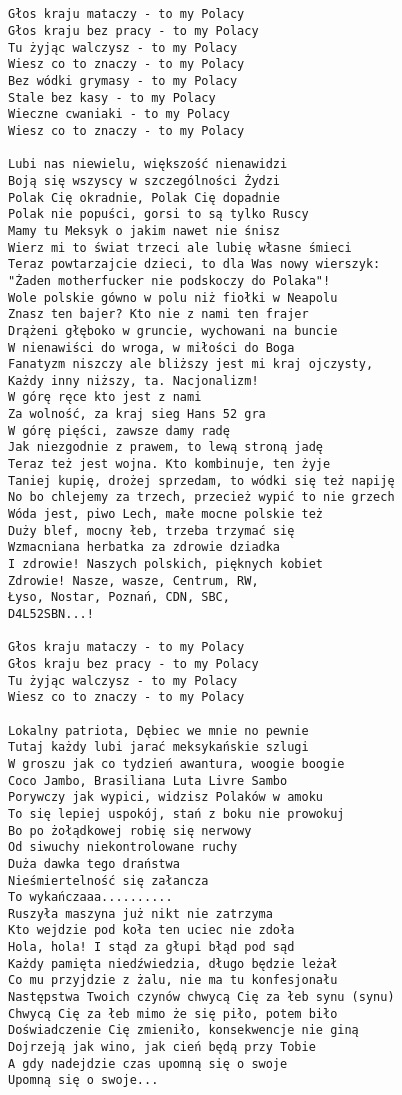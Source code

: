 \documentclass[12pt]{article}
\begin{document}
\subsection*{}
\begin{verbatim}
Głos kraju mataczy - to my Polacy
Głos kraju bez pracy - to my Polacy
Tu żyjąc walczysz - to my Polacy
Wiesz co to znaczy - to my Polacy
Bez wódki grymasy - to my Polacy
Stale bez kasy - to my Polacy
Wieczne cwaniaki - to my Polacy
Wiesz co to znaczy - to my Polacy

Lubi nas niewielu, większość nienawidzi
Boją się wszyscy w szczególności Żydzi
Polak Cię okradnie, Polak Cię dopadnie
Polak nie popuści, gorsi to są tylko Ruscy
Mamy tu Meksyk o jakim nawet nie śnisz
Wierz mi to świat trzeci ale lubię własne śmieci
Teraz powtarzajcie dzieci, to dla Was nowy wierszyk:
"Żaden motherfucker nie podskoczy do Polaka"!
Wole polskie gówno w polu niż fiołki w Neapolu
Znasz ten bajer? Kto nie z nami ten frajer
Drążeni głęboko w gruncie, wychowani na buncie
W nienawiści do wroga, w miłości do Boga
Fanatyzm niszczy ale bliższy jest mi kraj ojczysty,
Każdy inny niższy, ta. Nacjonalizm!
W górę ręce kto jest z nami
Za wolność, za kraj sieg Hans 52 gra
W górę pięści, zawsze damy radę
Jak niezgodnie z prawem, to lewą stroną jadę
Teraz też jest wojna. Kto kombinuje, ten żyje
Taniej kupię, drożej sprzedam, to wódki się też napiję
No bo chlejemy za trzech, przecież wypić to nie grzech
Wóda jest, piwo Lech, małe mocne polskie też
Duży blef, mocny łeb, trzeba trzymać się
Wzmacniana herbatka za zdrowie dziadka
I zdrowie! Naszych polskich, pięknych kobiet
Zdrowie! Nasze, wasze, Centrum, RW,
Łyso, Nostar, Poznań, CDN, SBC,
D4L52SBN...!

Głos kraju mataczy - to my Polacy
Głos kraju bez pracy - to my Polacy
Tu żyjąc walczysz - to my Polacy
Wiesz co to znaczy - to my Polacy

Lokalny patriota, Dębiec we mnie no pewnie
Tutaj każdy lubi jarać meksykańskie szlugi
W groszu jak co tydzień awantura, woogie boogie
Coco Jambo, Brasiliana Luta Livre Sambo
Porywczy jak wypici, widzisz Polaków w amoku
To się lepiej uspokój, stań z boku nie prowokuj
Bo po żołądkowej robię się nerwowy
Od siwuchy niekontrolowane ruchy
Duża dawka tego draństwa
Nieśmiertelność się załancza
To wykańczaaa..........
Ruszyła maszyna już nikt nie zatrzyma
Kto wejdzie pod koła ten uciec nie zdoła
Hola, hola! I stąd za głupi błąd pod sąd
Każdy pamięta niedźwiedzia, długo będzie leżał
Co mu przyjdzie z żalu, nie ma tu konfesjonału
Następstwa Twoich czynów chwycą Cię za łeb synu (synu)
Chwycą Cię za łeb mimo że się piło, potem biło
Doświadczenie Cię zmieniło, konsekwencje nie giną
Dojrzeją jak wino, jak cień będą przy Tobie
A gdy nadejdzie czas upomną się o swoje
Upomną się o swoje...


\end{verbatim}
\end{document}
